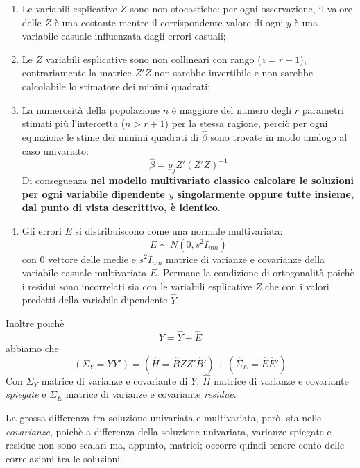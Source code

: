 \documentclass[a4page, 11pt]{article} %
\begin{document}
\begin{enumerate}[noitemsep]
\item Le  variabili esplicative $Z$ sono non stocastiche: per ogni osservazione, il valore delle $Z$ è una costante mentre il corrispondente valore di ogni $y$ è una variabile casuale influenzata dagli errori casuali;
\item Le $Z$ variabili esplicative sono non collineari con rango ($z=r+1$), contrariamente la matrice $Z'Z$ non sarebbe invertibile e non sarebbe calcolabile lo stimatore dei minimi quadrati;
\item La numerosità della popolazione $n$ è maggiore del numero degli $r$ parametri stimati più l'intercetta ($n > r+1$) per la stessa ragione, perciò per ogni equazione le stime dei minimi quadrati di $\hat{\beta}$ sono trovate in modo analogo al caso univariato:
\begin{equation*}
\hat{\beta} = y_j Z'(Z'Z)^{-1}
\end{equation*}
Di conseguenza \textbf{nel modello multivariato classico calcolare le soluzioni per ogni variabile dipendente $y$ singolarmente oppure tutte insieme, dal punto di vista descrittivo, è identico}.
\item Gli errori $E$ si distribuiscono come una normale multivariata:
\begin{equation*}
E \sim N(0,s^2 I_{nm})
\end{equation*}
con $0$ vettore delle medie  e $s^2 I_{nm}$ matrice di varianze e covarianze della variabile casuale multivariata $E$. Permane la condizione di ortogonalità poichè i residui sono incorrelati sia con le variabili esplicative $Z$ che con i valori predetti della variabile dipendente $\hat{Y}$.
\end{enumerate}
Inoltre poichè
\begin{equation*}
Y = \hat{Y} + \hat{E}
\end{equation*}
abbiamo che
\begin{equation*}
(\Sigma_Y = YY') = (\hat{H}=\hat{B}ZZ'\hat{B}')+(\hat{\Sigma}_E=\hat{E}\hat{E}')
\end{equation*}
Con $\Sigma_Y$ matrice di varianze e covariante di $Y$, $\hat{H}$ matrice di varianze e covariante \textit{spiegate} e $\Sigma_E$ matrice di varianze e covariante \textit{residue}.

La grossa differenza tra soluzione univariata e multivariata, però, sta nelle \textit{covarianze}, poichè a differenza della soluzione univariata, varianze spiegate e residue non sono scalari ma, appunto, matrici; occorre quindi tenere conto delle correlazioni tra le soluzioni.
\end{document}
